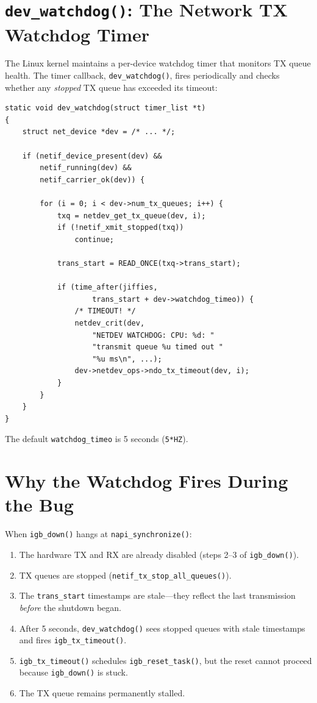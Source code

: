 \documentclass[11pt,a4paper,openany]{book}
\newcommand{\func}[1]{\texttt{#1()}}
\begin{document}
\section{\texttt{dev\_watchdog()}: The Network TX Watchdog Timer}

The Linux kernel maintains a per-device watchdog timer that monitors TX
queue health.  The timer callback, \func{dev\_watchdog}, fires
periodically and checks whether any \emph{stopped} TX queue has exceeded
its timeout:

\begin{lstlisting}[caption={\texttt{dev\_watchdog()} (net/sched/sch\_generic.c:500), simplified}]
static void dev_watchdog(struct timer_list *t)
{
    struct net_device *dev = /* ... */;

    if (netif_device_present(dev) &&
        netif_running(dev) &&
        netif_carrier_ok(dev)) {

        for (i = 0; i < dev->num_tx_queues; i++) {
            txq = netdev_get_tx_queue(dev, i);
            if (!netif_xmit_stopped(txq))
                continue;

            trans_start = READ_ONCE(txq->trans_start);

            if (time_after(jiffies,
                    trans_start + dev->watchdog_timeo)) {
                /* TIMEOUT! */
                netdev_crit(dev,
                    "NETDEV WATCHDOG: CPU: %d: "
                    "transmit queue %u timed out "
                    "%u ms\n", ...);
                dev->netdev_ops->ndo_tx_timeout(dev, i);
            }
        }
    }
}
\end{lstlisting}

The default \texttt{watchdog\_timeo} is 5 seconds (\texttt{5*HZ}).

\section{Why the Watchdog Fires During the Bug}

When \func{igb\_down} hangs at \func{napi\_synchronize}:

\begin{enumerate}
\item The hardware TX and RX are already disabled (steps 2--3 of
    \func{igb\_down}).
\item TX queues are stopped (\func{netif\_tx\_stop\_all\_queues}).
\item The \texttt{trans\_start} timestamps are stale---they reflect the
    last transmission \emph{before} the shutdown began.
\item After 5 seconds, \func{dev\_watchdog} sees stopped queues with
    stale timestamps and fires \func{igb\_tx\_timeout}.
\item \func{igb\_tx\_timeout} schedules \func{igb\_reset\_task}, but
    the reset cannot proceed because \func{igb\_down} is stuck.
\item The TX queue remains permanently stalled.
\end{enumerate}
\end{document}
